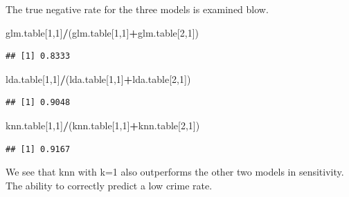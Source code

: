 \documentclass[
]{article}
\newenvironment{Shaded}{\begin{snugshade}}{\end{snugshade}}
\newcommand{\DecValTok}[1]{\textcolor[rgb]{0.00,0.00,0.81}{#1}}
\newcommand{\NormalTok}[1]{#1}
\newcommand{\OperatorTok}[1]{\textcolor[rgb]{0.81,0.36,0.00}{\textbf{#1}}}
\begin{document}
The true negative rate for the three models is examined blow.

\begin{Shaded}
\begin{Highlighting}[]
\NormalTok{glm.table[}\DecValTok{1}\NormalTok{,}\DecValTok{1}\NormalTok{]}\OperatorTok{/}\NormalTok{(glm.table[}\DecValTok{1}\NormalTok{,}\DecValTok{1}\NormalTok{]}\OperatorTok{+}\NormalTok{glm.table[}\DecValTok{2}\NormalTok{,}\DecValTok{1}\NormalTok{])}
\end{Highlighting}
\end{Shaded}

\begin{verbatim}
## [1] 0.8333
\end{verbatim}

\begin{Shaded}
\begin{Highlighting}[]
\NormalTok{lda.table[}\DecValTok{1}\NormalTok{,}\DecValTok{1}\NormalTok{]}\OperatorTok{/}\NormalTok{(lda.table[}\DecValTok{1}\NormalTok{,}\DecValTok{1}\NormalTok{]}\OperatorTok{+}\NormalTok{lda.table[}\DecValTok{2}\NormalTok{,}\DecValTok{1}\NormalTok{])}
\end{Highlighting}
\end{Shaded}

\begin{verbatim}
## [1] 0.9048
\end{verbatim}

\begin{Shaded}
\begin{Highlighting}[]
\NormalTok{knn.table[}\DecValTok{1}\NormalTok{,}\DecValTok{1}\NormalTok{]}\OperatorTok{/}\NormalTok{(knn.table[}\DecValTok{1}\NormalTok{,}\DecValTok{1}\NormalTok{]}\OperatorTok{+}\NormalTok{knn.table[}\DecValTok{2}\NormalTok{,}\DecValTok{1}\NormalTok{])}
\end{Highlighting}
\end{Shaded}

\begin{verbatim}
## [1] 0.9167
\end{verbatim}

We see that knn with k=1 also outperforms the other two models in
sensitivity. The ability to correctly predict a low crime rate.
\end{document}
